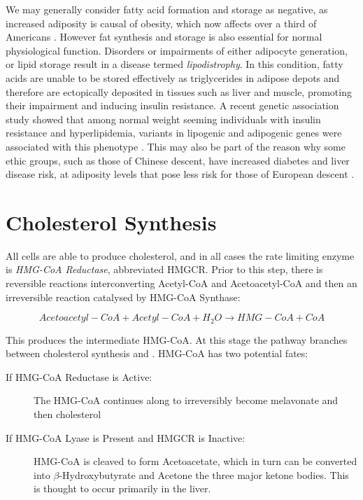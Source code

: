 \documentclass{tufte-handout}
\begin{document}
We may generally consider fatty acid formation and storage as negative, as increased adiposity is causal of obesity, which now affects over a third of Americans \citep{Flegal2016}.  However fat synthesis and storage is also essential for normal physiological function.  Disorders or impairments of either adipocyte generation, or lipid storage result in a disease termed \emph{lipodistrophy}.  In this condition, fatty acids are unable to be stored effectively as triglycerides in adipose depots and therefore are ectopically deposited in tissues such as liver and muscle, promoting their impairment and inducing insulin resistance.  A recent genetic association study showed that among normal weight seeming individuals with insulin resistance and hyperlipidemia, variants in lipogenic and adipogenic genes were associated with this phenotype \citep{Lotta2016a}.  This may also be part of the reason why some ethic groups, such as those of Chinese descent, have increased diabetes and liver disease risk, at adiposity levels that pose less risk for those of European descent \citep{Chiu2011a}.

\section{Cholesterol Synthesis}

All cells are able to produce cholesterol, and in all cases the rate limiting enzyme is \emph{HMG-CoA Reductase}, abbreviated HMGCR.  Prior to this step, there is reversible reactions interconverting Acetyl-CoA and Acetoacetyl-CoA and then an irreversible reaction catalysed by HMG-CoA Synthase:

\begin{equation}\label{eq:hmgcs}
Acetoacetyl-CoA + Acetyl-CoA + H_2O \rightarrow HMG-CoA + CoA
\end{equation}

This produces the intermediate HMG-CoA.  At this stage the pathway branches between cholesterol synthesis and .  HMG-CoA has two potential fates:
\begin{description}
\item [If HMG-CoA Reductase is Active:] The HMG-CoA continues along to irreversibly become melavonate and then cholesterol
\item [If HMG-CoA Lyase is Present and HMGCR is Inactive:] HMG-CoA is cleaved to form Acetoacetate, which in turn can be converted into $\beta$-Hydroxybutyrate and Acetone the three major ketone bodies.  This is thought to occur primarily in the liver.
\end{description}
\end{document}
